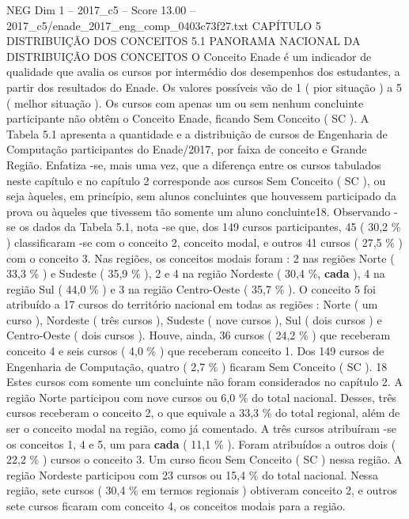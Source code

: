 \begin{textsample}{NEG Dim 1 – 2017\_c5 – Score 13.00 – 2017\_c5/enade\_2017\_eng\_comp\_0403c73f27.txt}  \label{ex:f1_neg_388}
CAPÍTULO 5 DISTRIBUIÇÃO DOS CONCEITOS 5.1 PANORAMA NACIONAL DA DISTRIBUIÇÃO DOS CONCEITOS O Conceito Enade é um indicador de qualidade que avalia os cursos por intermédio dos desempenhos dos estudantes, a partir dos resultados do Enade.
Os valores possíveis vão de 1 ( pior situação ) a 5 ( melhor situação ).
Os cursos com apenas um ou sem nenhum concluinte participante não obtêm o Conceito Enade, ficando Sem Conceito ( SC ).
A Tabela 5.1 apresenta a quantidade e a distribuição de cursos de Engenharia de Computação participantes do Enade/2017, por faixa de conceito e Grande Região.
Enfatiza -se, mais uma vez, que a diferença entre os cursos tabulados neste capítulo e no capítulo 2 corresponde aos cursos Sem Conceito ( SC ), ou seja àqueles, em princípio, sem alunos concluintes que houvessem participado da prova ou àqueles que tivessem tão somente um aluno concluinte18.
Observando -se os dados da Tabela 5.1, nota -se que, dos 149 cursos participantes, 45 ( 30,2 \% ) classificaram -se com o conceito 2, conceito modal, e outros 41 cursos ( 27,5 \% ) com o conceito 3.
Nas regiões, os conceitos modais foram : 2 nas regiões Norte ( 33,3 \% ) e Sudeste ( 35,9 \% ), 2 e 4 na região Nordeste ( 30,4 \%, \textbf{cada} ), 4 na região Sul ( 44,0 \% ) e 3 na região Centro-Oeste ( 35,7 \% ).
O conceito 5 foi atribuído a 17 cursos do território nacional em todas as regiões : Norte ( um curso ), Nordeste ( três cursos ), Sudeste ( nove cursos ), Sul ( dois cursos ) e Centro-Oeste ( dois cursos ).
Houve, ainda, 36 cursos ( 24,2 \% ) que receberam conceito 4 e seis cursos ( 4,0 \% ) que receberam conceito 1.
Dos 149 cursos de Engenharia de Computação, quatro ( 2,7 \% ) ficaram Sem Conceito ( SC ). 18 Estes cursos com somente um concluinte não foram considerados no capítulo 2.
A região Norte participou com nove cursos ou 6,0 \% do total nacional.
Desses, três cursos receberam o conceito 2, o que equivale a 33,3 \% do total regional, além de ser o conceito modal na região, como já comentado.
A três cursos atribuíram -se os conceitos 1, 4 e 5, um para \textbf{cada} ( 11,1 \% ).
Foram atribuídos a outros dois ( 22,2 \% ) cursos o conceito 3.
Um curso ficou Sem Conceito ( SC ) nessa região.
A região Nordeste participou com 23 cursos ou 15,4 \% do total nacional.
Nessa região, sete cursos ( 30,4 \% em termos regionais ) obtiveram conceito 2, e outros sete cursos ficaram com conceito 4, os conceitos modais para a região.

\end{textsample}
